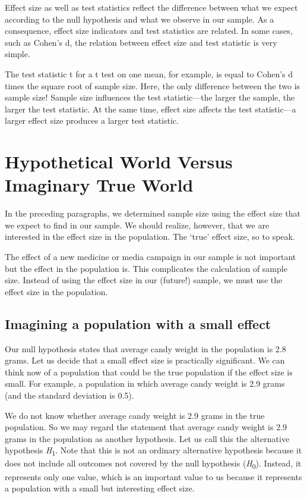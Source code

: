 \documentclass[a4paper]{book}
\theoremstyle{definition}
\theoremstyle{definition}
\theoremstyle{definition}
\theoremstyle{remark}
\begin{document}
Effect size as well as test statistics reflect the difference between
what we expect according to the null hypothesis and what we observe in
our sample. As a consequence, effect size indicators and test statistics
are related. In some cases, such as Cohen's d, the relation between
effect size and test statistic is very simple.

The test statistic t for a t test on one mean, for example, is equal to
Cohen's d times the square root of sample size. Here, the only
difference between the two is sample size! Sample size influences the
test statistic---the larger the sample, the larger the test statistic.
At the same time, effect size affects the test statistic---a larger
effect size produces a larger test statistic.

\section{Hypothetical World Versus Imaginary True
World}\label{hypothetical-world-versus-imaginary-true-world}

In the preceding paragraphs, we determined sample size using the effect
size that we expect to find in our sample. We should realize, however,
that we are interested in the effect size in the population. The `true'
effect size, so to speak.

The effect of a new medicine or media campaign in our sample is not
important but the effect in the population is. This complicates the
calculation of sample size. Instead of using the effect size in our
(future!) sample, we must use the effect size in the population.

\subsection{Imagining a population with a small
effect}\label{imagining-a-population-with-a-small-effect}

Our null hypothesis states that average candy weight in the population
is 2.8 grams. Let us decide that a small effect size is practically
significant. We can think now of a population that could be the true
population if the effect size is small. For example, a population in
which average candy weight is 2.9 grams (and the standard deviation is
0.5).

We do not know whether average candy weight is 2.9 grams in the true
population. So we may regard the statement that average candy weight is
2.9 grams in the population as another hypothesis. Let us call this the
alternative hypothesis \emph{H}\textsubscript{1}. Note that this is not
an ordinary alternative hypothesis because it does not include all
outcomes not covered by the null hypothesis (\emph{H}\textsubscript{0}).
Instead, it represents only one value, which is an important value to us
because it represents a population with a small but interesting effect
size.
\end{document}
